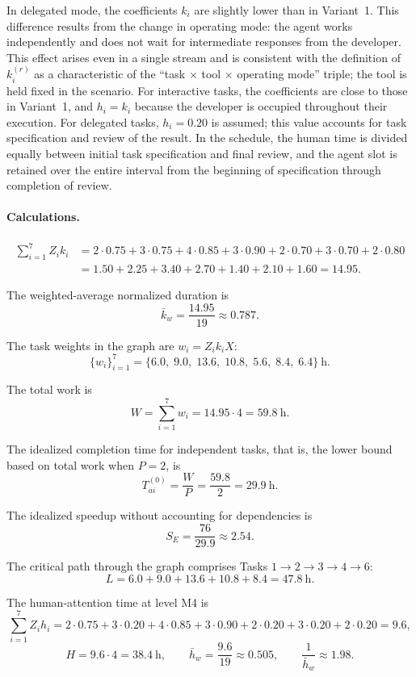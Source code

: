 In delegated mode, the coefficients $k_i$ are slightly lower than in
Variant~1. This difference results from the change in operating mode: the
agent works independently and does not wait for intermediate responses from
the developer. This effect arises even in a single stream and is consistent
with the definition of $k_i^{(r)}$ as a characteristic of the ``task
$\times$ tool $\times$ operating mode'' triple; the tool is held fixed in the
scenario. For interactive tasks, the coefficients are close to those in
Variant~1, and $h_i = k_i$ because the developer is occupied throughout their
execution. For delegated tasks, $h_i = 0.20$ is assumed; this value accounts
for task specification and review of the result. In the schedule, the human
time is divided equally between initial task specification and final review,
and the agent slot is retained over the entire interval from the beginning of
specification through completion of review.

\paragraph{Calculations.}
\begin{align*}
  \sum_{i=1}^{7} Z_i k_i &= 2{\cdot}0.75 + 3{\cdot}0.75 + 4{\cdot}0.85 + 3{\cdot}0.90 + 2{\cdot}0.70 + 3{\cdot}0.70 + 2{\cdot}0.80 \\
  &= 1.50 + 2.25 + 3.40 + 2.70 + 1.40 + 2.10 + 1.60 = 14.95.
\end{align*}

The weighted-average normalized duration is
\[
  \bar{k}_w = \frac{14.95}{19} \approx 0.787.
\]

The task weights in the graph are $w_i = Z_i k_i X$:
\[
  \{w_i\}_{i=1}^{7} = \{6.0,\; 9.0,\; 13.6,\; 10.8,\; 5.6,\; 8.4,\; 6.4\}~\text{h}.
\]

The total work is
\[
  W = \sum_{i=1}^{7} w_i = 14.95 \cdot 4 = 59.8~\text{h}.
\]

The idealized completion time for independent tasks, that is, the lower bound
based on total work when $P = 2$, is
\[
  T_{ai}^{(0)} = \frac{W}{P} = \frac{59.8}{2} = 29.9~\text{h}.
\]

The idealized speedup without accounting for dependencies is
\[
  S_E = \frac{76}{29.9} \approx 2.54.
\]

The critical path through the graph comprises Tasks
$1 \to 2 \to 3 \to 4 \to 6$:
\[
  L = 6.0 + 9.0 + 13.6 + 10.8 + 8.4 = 47.8~\text{h}.
\]

The human-attention time at level M4 is
\[
  \sum_{i=1}^{7} Z_i h_i = 2{\cdot}0.75 + 3{\cdot}0.20 + 4{\cdot}0.85 + 3{\cdot}0.90 + 2{\cdot}0.20 + 3{\cdot}0.20 + 2{\cdot}0.20 = 9.6,
\]
\[
  H = 9.6 \cdot 4 = 38.4~\text{h},
  \qquad
  \bar{h}_w = \frac{9.6}{19} \approx 0.505,
  \qquad
  \frac{1}{\bar{h}_w} \approx 1.98.
\]

